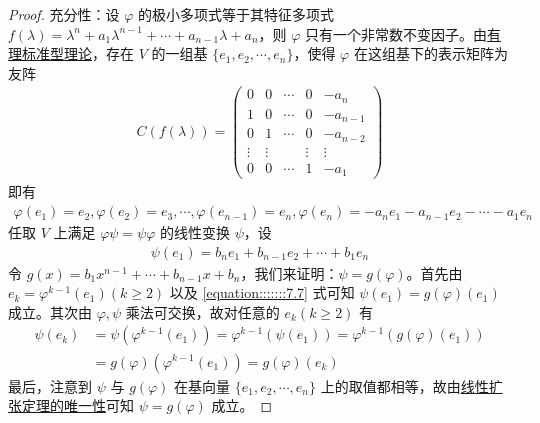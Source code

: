 \documentclass[../../main.tex]{subfiles}%
\begin{document}
\begin{proof}

{\heiti 充分性：}设 $\varphi$ 的极小多项式等于其特征多项式 $f(\lambda)=\lambda^n + a_1\lambda^{n - 1}+\cdots + a_{n - 1}\lambda + a_n$，则 $\varphi$ 只有一个非常数不变因子。由\hyperref[theorem:有理标准型核心定理]{有理标准型理论}，存在 $V$ 的一组基 $\{e_1,e_2,\cdots,e_n\}$，使得 $\varphi$ 在这组基下的表示矩阵为友阵
\begin{align*}
C(f(\lambda))=\begin{pmatrix}
0 & 0 & \cdots & 0 & -a_n \\
1 & 0 & \cdots & 0 & -a_{n - 1} \\
0 & 1 & \cdots & 0 & -a_{n - 2} \\
\vdots & \vdots & & \vdots & \vdots \\
0 & 0 & \cdots & 1 & -a_1
\end{pmatrix}
\end{align*}
即有
\begin{align*}
\varphi(e_1)=e_2,\varphi(e_2)=e_3,\cdots,\varphi(e_{n - 1})=e_n,\varphi(e_n)=-a_ne_1 - a_{n - 1}e_2 - \cdots - a_1e_n
\end{align*}
任取 $V$ 上满足 $\varphi\psi = \psi\varphi$ 的线性变换 $\psi$，设
\begin{align}
\psi(e_1)=b_ne_1 + b_{n - 1}e_2 + \cdots + b_1e_n\label{equation:::::::7.7}
\end{align}
令 $g(x)=b_1x^{n - 1}+\cdots + b_{n - 1}x + b_n$，我们来证明：$\psi = g(\varphi)$。首先由 $e_k=\varphi^{k - 1}(e_1)(k\geqslant  2)$ 以及 \eqref{equation:::::::7.7} 式可知 $\psi(e_1)=g(\varphi)(e_1)$ 成立。其次由 $\varphi,\psi$ 乘法可交换，故对任意的 $e_k(k\geqslant  2)$ 有
\begin{align*}
\psi(e_k)&=\psi(\varphi^{k - 1}(e_1))=\varphi^{k - 1}(\psi(e_1))=\varphi^{k - 1}(g(\varphi)(e_1))\\
&=g(\varphi)(\varphi^{k - 1}(e_1))=g(\varphi)(e_k)
\end{align*}
最后，注意到 $\psi$ 与 $g(\varphi)$ 在基向量 $\{e_1,e_2,\cdots,e_n\}$ 上的取值都相等，故由\hyperref[theorem:线性扩张定理]{线性扩张定理的唯一性}可知 $\psi = g(\varphi)$ 成立。


\end{proof}
\end{document}
